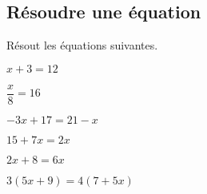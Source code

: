 \subsection{Résoudre une équation}

\begin{exercicefr}
    Résout les équations suivantes.
    \begin{exerciceenumnoeq}
        \item $x+ 3 = 12$
        \item $\dfrac{x}{8} = 16$
        \item $-3x + 17 = 21 - x$
        \item $15 + 7x = 2x$
        \item $2x+8 = 6x$
        \item $3(5x + 9) = 4(7 + 5x)$
    \end{exerciceenumnoeq}
\end{exercicefr}